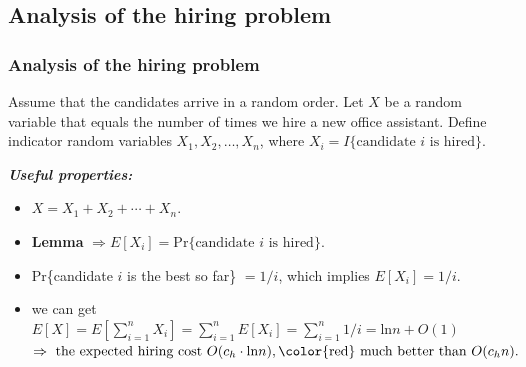 \documentclass[notes,serif]{beamer}
\begin{document}
\subsection{Analysis of the hiring problem}
\begin{frame}
\frametitle{Analysis of the hiring problem}
Assume that the candidates arrive in a random order.  Let $X$ be a random variable that equals the number of times we hire a new office assistant.  Define indicator random variables $X_1, X_2, \dots , X_n$, where $X_i = I\{\text{candidate $i$ is hired}\}$.

\begin{block}{\bf \em Useful properties:}
  \begin{itemize}
    \item $X = X_1 + X_2 + \cdots + X_n$.
    \item {\bf Lemma} $\Rightarrow E[X_i] = \text{Pr}\{\text{candidate $i$ is hired}\}$.
    \item Pr\{candidate $i$ is the best so far\} $= 1/i$, which implies $E[X_i] = 1/i$.
    \item we can get \\
      $ E[X] = E [ \sum_{i=1}^n X_i ] = \sum_{i=1}^nE[X_i ] = \sum_{i=1}^n 1/i = \text{ln}n + O(1) $
      $ \Rightarrow \mbox { the expected hiring cost } O(c_h \cdot \text{ln}n), \mbox{\color{red} much better than } O(c_h n).
      $
  \end{itemize}
\end{block}
\end{frame}
\end{document}

